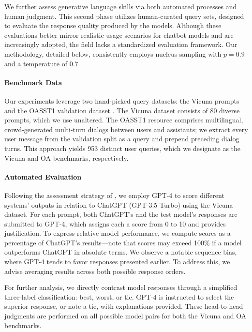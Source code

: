 We further assess generative language skills via both automated processes and human judgment. This second phase utilizes human-curated query sets, designed to evaluate the response quality produced by the models. Although these evaluations better mirror realistic usage scenarios for chatbot models and are increasingly adopted, the field lacks a standardized evaluation framework. Our methodology, detailed below, consistently employs nucleus sampling with $p=0.9$ and a temperature of $0.7$.

\paragraph{Benchmark Data} Our experiments leverage two hand-picked query datasets: the Vicuna prompts \citep{vicuna2023} and the OASST1 validation dataset \citep{kopf2023openassistant}. The Vicuna dataset consists of 80 diverse prompts, which we use unaltered. The OASST1 resource comprises multilingual, crowd-generated multi-turn dialogs between users and assistants; we extract every user message from the validation split as a query and prepend preceding dialog turns. This approach yields 953 distinct user queries, which we designate as the Vicuna and OA benchmarks, respectively.

\paragraph{Automated Evaluation} Following the assessment strategy of \citet{vicuna2023}, we employ GPT-4 to score different systems’ outputs in relation to ChatGPT (GPT-3.5 Turbo) using the Vicuna dataset. For each prompt, both ChatGPT’s and the test model’s responses are submitted to GPT-4, which assigns each a score from 0 to 10 and provides justification. To express relative model performance, we compute scores as a percentage of ChatGPT's results—note that scores may exceed 100\% if a model outperforms ChatGPT in absolute terms. We observe a notable sequence bias, where GPT-4 tends to favor responses presented earlier. To address this, we advise averaging results across both possible response orders.

For further analysis, we directly contrast model responses through a simplified three-label classification: best, worst, or tie. GPT-4 is instructed to select the superior response, or note a tie, with explanations provided. These head-to-head judgments are performed on all possible model pairs for both the Vicuna and OA benchmarks.


